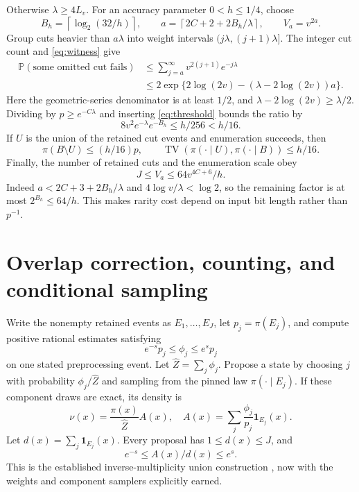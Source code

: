 \documentclass[11pt]{article}
\newcommand{\TV}{\operatorname{TV}}
\newcommand{\Prb}{\mathbb P}
\newcommand{\ceil}[1]{\left\lceil #1\right\rceil}
\newcommand{\ind}{\mathbf 1}
\begin{document}
Otherwise $\lambda\ge4L_v$. For an accuracy parameter $0<h\le1/4$, choose
\begin{equation}
 B_h=\ceil{\log_2(32/h)},\qquad
 a=\ceil{2C+2+2B_h/\lambda},\qquad V_a=v^{2a}.
 \label{eq:threshold}
\end{equation}
Group cuts heavier than $a\lambda$ into weight intervals $(j\lambda,(j+1)\lambda]$. The integer cut count and \eqref{eq:witness} give
\begin{align*}
 \Prb(\text{some omitted cut fails})
 &\le\sum_{j=a}^\infty v^{2(j+1)}e^{-j\lambda}\\
 &\le2\exp\{2\log(2v)-(\lambda-2\log(2v))a\}.
\end{align*}
Here the geometric-series denominator is at least $1/2$, and $\lambda-2\log(2v)\ge\lambda/2$. Dividing by $p\ge e^{-C\lambda}$ and inserting \eqref{eq:threshold} bounds the ratio by
\[
 8v^2e^{-\lambda}e^{-B_h}\le h/256<h/16.
\]
If $U$ is the union of the retained cut events and enumeration succeeds, then
\begin{equation}
 \pi(B\setminus U)\le(h/16)p,
 \qquad \TV(\pi(\cdot\mid U),\pi(\cdot\mid B))\le h/16.
 \label{eq:tail}
\end{equation}
Finally, the number of retained cuts and the enumeration scale obey
\begin{equation}
 J\le V_a\le64v^{4C+6}/h.
 \label{eq:Jbound}
\end{equation}
Indeed $a<2C+3+2B_h/\lambda$ and $4\log v/\lambda<\log2$, so the remaining factor is at most $2^{B_h}\le64/h$. This makes rarity cost depend on input bit length rather than $p^{-1}$.

\section{Overlap correction, counting, and conditional sampling}
\label{sec:static}
Write the nonempty retained events as $E_1,\ldots,E_J$, let $p_j=\pi(E_j)$, and compute positive rational estimates satisfying
\[
 e^{-s}p_j\le\phi_j\le e^sp_j
\]
on one stated preprocessing event. Let $\widehat Z=\sum_j\phi_j$. Propose a state by choosing $j$ with probability $\phi_j/\widehat Z$ and sampling from the pinned law $\pi(\cdot\mid E_j)$. If these component draws are exact, its density is
\[
 \nu(x)=\frac{\pi(x)}{\widehat Z}A(x),\quad
 A(x)=\sum_j\frac{\phi_j}{p_j}\ind_{E_j}(x).
\]
Let $d(x)=\sum_j\ind_{E_j}(x)$. Every proposal has $1\le d(x)\le J$, and
\begin{equation}
 e^{-s}\le A(x)/d(x)\le e^s.
 \label{eq:density}
\end{equation}
This is the established inverse-multiplicity union construction \cite{karpluby}, now with the weights and component samplers explicitly earned.
\end{document}
